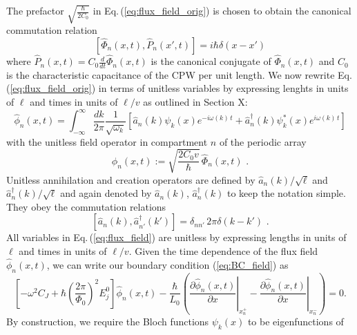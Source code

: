 %
The prefactor $\displaystyle{\sqrt{\frac{\hbar}{2 C_0}}}$ in Eq.\,(\ref{eq:flux_field_orig}) is chosen 
to obtain the canonical commutation relation 
%
\begin{equation} \label{eq:commrelphi}
\left[ \hat{\Phi}_n(x,t), \hat{P}_n(x',t) \right] = i \hbar \delta(x-x')
\end{equation}
%
where $\hat{P}_n(x,t) = C_0 \displaystyle{\frac{d}{dt}} \hat{\Phi}_n(x,t)$ is the 
canonical conjugate of $\hat{\Phi}_n(x,t)$ and $C_0$ is the characteristic capacitance of the CPW per unit length. 
%
We now rewrite Eq.\,(\ref{eq:flux_field_orig}) in terms of unitless variables 
by expressing lenghts in units of $\ell$ and times in units of $\ell/v$
as outlined in \color{red} Section X:  \color{blue}  
%
\begin{equation} \label{eq:flux_field}
    \hat{\phi}_n(x,t) = 
    \int_{-\infty}^{\infty}\frac{dk}{2 \pi} \frac{1}{\sqrt{\omega_k}}
    \left[ \hat{a}_n(k) \psi_k(x)e^{-i \omega(k) \, t} + 
    \hat{a}_n^{\dagger}(k) \psi_k^*(x) e^{i \omega(k) \, t} \right]
\end{equation}
%
with the unitless field operator in compartment $n$ of the periodic array
%
\begin{equation} \label{eq:ufo}
\hat{\phi}_n(x,t) := \sqrt{\frac{2 C_0 v}{\hbar}} \, \hat{\Phi}_n(x,t) \, \, .
\end{equation}
%
Unitless annihilation and creation operators are defined by $\hat{a}_n(k)/\sqrt{\ell}$ 
and ${\hat a}_{n}^\dagger(k) / \sqrt{\ell}$ and again denoted by
$\hat{a}_n(k)$, ${\hat a}_{n}^\dagger(k)$ to keep the notation simple. 
They obey the commutation relations 
%
\begin{equation} \label{eq:cra}
    \left[ \hat{a}_n(k),{\hat a}_{n'}^\dagger(k') \right] = \delta_{nn'} \, 2 \pi \delta(k - k') \, \, .
\end{equation}
%
All variables in Eq.\,(\ref{eq:flux_field}) are unitless by expressing lengths in units of $\ell$
and times in units of $\ell/v$.
%
\color{black}
%
%
Given the time dependence of the flux field $\hat{\phi}_n(x,t)$, we can write our boundary condition (\ref{eq:BC_field}) as
%
\begin{equation}
\left[-\omega^2 C_{J}+\hbar\left(\frac{2 \pi}{\Phi_{0}}\right)^{2} E_{j}^0\right]\hat{\phi}_n(x,t) -\frac{\hbar}{L_{0}}\left(\left.\frac{\partial \hat{\phi}_n(x,t)}{\partial x}\right|_{x_n^{+}}-\left.\frac{\partial \hat{\phi}_n(x,t)}{\partial x}\right|_{x_n^{-}}\right)=0.
\end{equation}
%
By construction, we require the Bloch functions $\psi_k(x)$ to be eigenfunctions of
